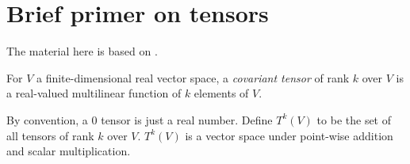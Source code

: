\documentclass{article} %
\begin{document}
\section{Brief primer on tensors}
The material here is based on \cite{lee-book-2000}.


\begin{definition} For $V$ a finite-dimensional real vector space, a {\em covariant tensor} of rank $k$ over $V$ is a real-valued multilinear function of $k$ elements of $V$.
\end{definition}

By convention, a $0$ tensor is just a real number. Define $T^k(V)$ to be the set of all tensors of rank $k$ over $V$. $T^k(V)$ is a vector space under point-wise addition and scalar multiplication.
\end{document}
